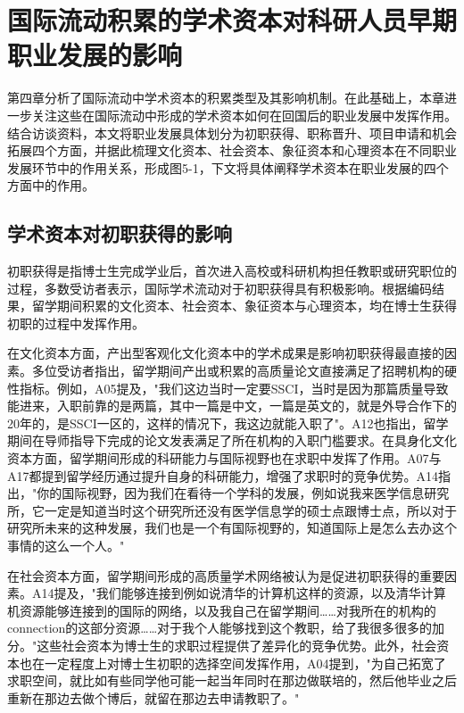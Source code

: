 \chapter{国际流动积累的学术资本对科研人员早期职业发展的影响}

第四章分析了国际流动中学术资本的积累类型及其影响机制。在此基础上，本章进一步关注这些在国际流动中形成的学术资本如何在回国后的职业发展中发挥作用。结合访谈资料，本文将职业发展具体划分为初职获得、职称晋升、项目申请和机会拓展四个方面，并据此梳理文化资本、社会资本、象征资本和心理资本在不同职业发展环节中的作用关系，形成图5-1，下文将具体阐释学术资本在职业发展的四个方面中的作用。


\section{学术资本对初职获得的影响}

初职获得是指博士生完成学业后，首次进入高校或科研机构担任教职或研究职位的过程，多数受访者表示，国际学术流动对于初职获得具有积极影响。根据编码结果，留学期间积累的文化资本、社会资本、象征资本与心理资本，均在博士生获得初职的过程中发挥作用。

在文化资本方面，产出型客观化文化资本中的学术成果是影响初职获得最直接的因素。多位受访者指出，留学期间产出或积累的高质量论文直接满足了招聘机构的硬性指标。例如，A05提及，"我们这边当时一定要SSCI，当时是因为那篇质量导致能进来，入职前靠的是两篇，其中一篇是中文，一篇是英文的，就是外导合作下的20年的，是SSCI一区的，这样的情况下，我这边就能入职了"。A12也指出，留学期间在导师指导下完成的论文发表满足了所在机构的入职门槛要求。在具身化文化资本方面，留学期间形成的科研能力与国际视野也在求职中发挥了作用。A07与A17都提到留学经历通过提升自身的科研能力，增强了求职时的竞争优势。A14指出，"你的国际视野，因为我们在看待一个学科的发展，例如说我来医学信息研究所，它一定是知道当时这个研究所还没有医学信息学的硕士点跟博士点，所以对于研究所未来的这种发展，我们也是一个有国际视野的，知道国际上是怎么去办这个事情的这么一个人。"

在社会资本方面，留学期间形成的高质量学术网络被认为是促进初职获得的重要因素。A14提及，"我们能够连接到例如说清华的计算机这样的资源，以及清华计算机资源能够连接到的国际的网络，以及我自己在留学期间……对我所在的机构的connection的这部分资源……对于我个人能够找到这个教职，给了我很多很多的加分。"这些社会资本为博士生的求职过程提供了差异化的竞争优势。此外，社会资本也在一定程度上对博士生初职的选择空间发挥作用，A04提到，"为自己拓宽了求职空间，就比如有些同学他可能一起当年同时在那边做联培的，然后他毕业之后重新在那边去做个博后，就留在那边去申请教职了。"

